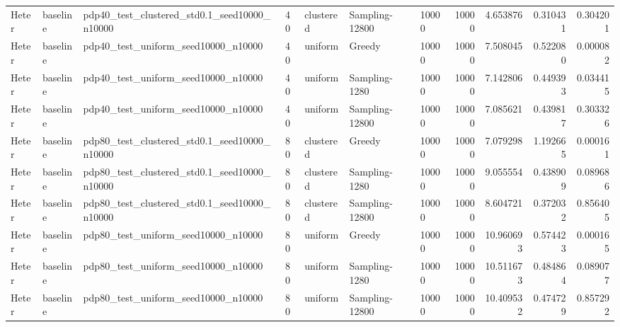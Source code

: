 \begin{tabular}{lllllllrrrr}
Heter & baseline & pdp40_test_clustered_std0.1_seed10000_n10000 & 40 & clustered & Sampling-12800 & 10000 & 10000 & 4.653876 & 0.310431 & 0.304201 \\
Heter & baseline & pdp40_test_uniform_seed10000_n10000 & 40 & uniform & Greedy & 10000 & 10000 & 7.508045 & 0.522080 & 0.000082 \\
Heter & baseline & pdp40_test_uniform_seed10000_n10000 & 40 & uniform & Sampling-1280 & 10000 & 10000 & 7.142806 & 0.449393 & 0.034415 \\
Heter & baseline & pdp40_test_uniform_seed10000_n10000 & 40 & uniform & Sampling-12800 & 10000 & 10000 & 7.085621 & 0.439817 & 0.303326 \\
Heter & baseline & pdp80_test_clustered_std0.1_seed10000_n10000 & 80 & clustered & Greedy & 10000 & 10000 & 7.079298 & 1.192665 & 0.000161 \\
Heter & baseline & pdp80_test_clustered_std0.1_seed10000_n10000 & 80 & clustered & Sampling-1280 & 10000 & 10000 & 9.055554 & 0.438909 & 0.089686 \\
Heter & baseline & pdp80_test_clustered_std0.1_seed10000_n10000 & 80 & clustered & Sampling-12800 & 10000 & 10000 & 8.604721 & 0.372032 & 0.856405 \\
Heter & baseline & pdp80_test_uniform_seed10000_n10000 & 80 & uniform & Greedy & 10000 & 10000 & 10.960693 & 0.574423 & 0.000165 \\
Heter & baseline & pdp80_test_uniform_seed10000_n10000 & 80 & uniform & Sampling-1280 & 10000 & 10000 & 10.511673 & 0.484864 & 0.089077 \\
Heter & baseline & pdp80_test_uniform_seed10000_n10000 & 80 & uniform & Sampling-12800 & 10000 & 10000 & 10.409532 & 0.474729 & 0.857292 \\
\bottomrule
\end{tabular}
